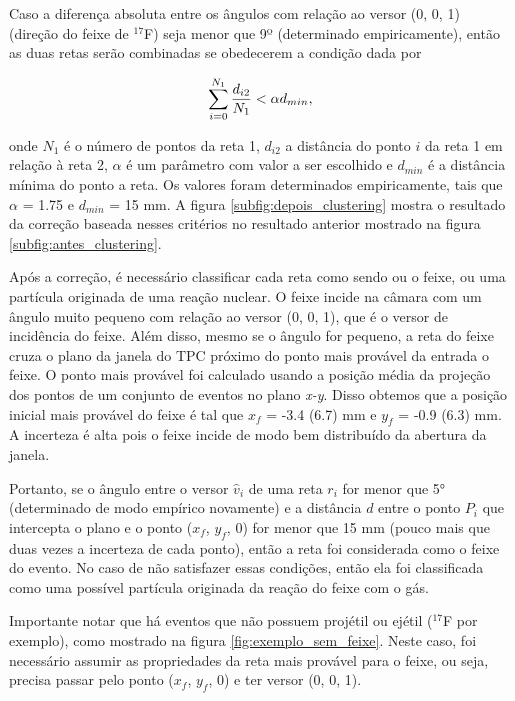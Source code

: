 \documentclass[a4paper,12pt,oneside]{book}
\begin{document}
\par Caso a diferença absoluta entre os ângulos com relação ao versor (0, 0, 1) (direção do feixe de $^{17}$F) seja menor que 9º (determinado empiricamente), então as duas retas serão combinadas se obedecerem a condição dada por

\begin{equation}\label{criterio_clustering}
    \sum_{i = 0}^{N_1}\frac{d_{i2}}{N_1} < \alpha \space d_{min}, 
\end{equation}

onde $N_1$ é o número de pontos da reta 1, $d_{i2}$ a distância do ponto $i$ da reta 1 em relação à reta 2, $\alpha$ é um parâmetro com valor a ser escolhido e $d_{min}$ é a distância mínima do ponto a reta. Os valores foram determinados empiricamente, tais que $\alpha$ = 1.75 e $d_{min}$ = 15 mm. A figura \ref{subfig:depois_clustering} mostra o resultado da correção baseada nesses critérios no resultado anterior mostrado na figura \ref{subfig:antes_clustering}.

\par Após a correção, é necessário classificar cada reta como sendo ou o feixe, ou uma partícula originada de uma reação nuclear. O feixe incide na câmara com um ângulo muito pequeno com relação ao versor (0, 0, 1), que é o versor de incidência do feixe. Além disso, mesmo se o ângulo for pequeno, a reta do feixe cruza o plano da janela do TPC próximo do ponto mais provável da entrada o feixe. O ponto mais provável foi calculado usando a posição média da projeção dos pontos de um conjunto de eventos no plano \textit{x-y}. Disso obtemos que a posição inicial mais provável do feixe é tal que $x_f$ = -3.4 (6.7) mm e $y_f$ = -0.9 (6.3) mm. A incerteza é alta pois o feixe incide de modo bem distribuído da abertura da janela.

\par Portanto, se o ângulo entre o versor $\hat{v}_i$ de uma reta $r_i$ for menor que 5° (determinado de modo empírico novamente) e a distância $d$ entre o ponto $P_i$ que intercepta o plano e o ponto ($x_f$, $y_f$, 0) for menor que 15 mm (pouco mais que duas vezes a incerteza de cada ponto), então a reta foi considerada como o feixe do evento. No caso de não satisfazer essas condições, então ela foi classificada como uma possível partícula originada da reação do feixe com o gás.

\par Importante notar que há eventos que não possuem projétil ou ejétil ($^{17}$F por exemplo), como mostrado na figura \ref{fig:exemplo_sem_feixe}. Neste caso, foi necessário assumir as propriedades da reta mais provável para o feixe, ou seja, precisa passar pelo ponto ($x_f$, $y_f$, 0) e ter versor (0, 0, 1).
\end{document}
